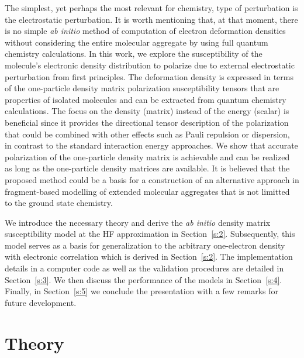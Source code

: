 \documentclass[aip,amsmath,amssymb,reprint,floatfix]{revtex4-1}
\begin{document}
The simplest, yet perhaps the most relevant for chemistry, type of perturbation 
is the electrostatic perturbation.
It is worth mentioning that, at that moment, there is no simple \emph{ab initio}
method of computation of electron deformation densities without considering the entire molecular 
aggregate by using full quantum chemistry calculations.\cite{Horn.Head-Gordon.JCP.2015,
Mandado.Hermida-Ramon.JCTC.2011}
In this work, we explore the susceptibility of the molecule's electronic density distribution
to polarize due to external electrostatic perturbation from first principles. 
The deformation density is expressed in terms
of the one\hyp{}particle density matrix polarization susceptibility tensors 
that are properties of isolated molecules and can be
extracted from quantum chemistry calculations. The focus on the density (matrix) instead of the energy
(scalar) is beneficial since it provides the directional tensor description
of the polarization that could be combined with other effects such as Pauli repulsion 
or dispersion,\cite{Mandado.Hermida-Ramon.JCTC.2011}
in contrast to the standard interaction energy approaches. We show that accurate polarization 
of the one\hyp{}particle density
matrix is achievable and can be realized as long as the one\hyp{}particle density matrices
are available. It is believed that the proposed method
could be a basis for a construction of an 
alternative approach in fragment\hyp{}based
modelling of extended molecular aggregates that is not limitted to the ground state chemistry.

We introduce the necessary theory and derive the \emph{ab initio} density matrix susceptibility model
at the HF approximation\cite{Roothaan.RevModPhys.1951} 
in Section~\ref{s:2}. Subsequently, this model serves as a basis for generalization to the 
arbitrary one\hyp{}electron density with electronic correlation which is derived in Section~\ref{s:2}. 
The implementation details in a computer code as well as the validation procedures are detailed
in Section~\ref{s:3}. We then discuss the performance of the models in Section~\ref{s:4}.
Finally, in Section~\ref{s:5} we conclude the presentation with a few 
remarks for future development.

\section{\label{s:2}Theory}
\end{document}
